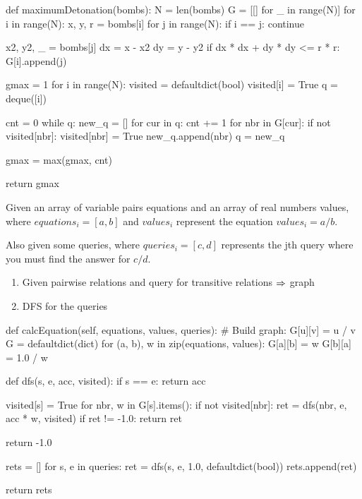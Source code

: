 \begin{python}
def maximumDetonation(bombs):
    N = len(bombs)
    G = [[] for _ in range(N)]
    for i in range(N):
        x, y, r = bombs[i]
        for j in range(N):
            if i == j:
                continue
                
            x2, y2, _ = bombs[j]
            dx = x - x2
            dy = y - y2
            if dx * dx + dy * dy <= r * r:
                G[i].append(j)

    gmax = 1
    for i in range(N):
        visited = defaultdict(bool)
        visited[i] = True
        q = deque([i])

        cnt = 0
        while q:
            new_q = []
            for cur in q:
                cnt += 1
                for nbr in G[cur]:
                    if not visited[nbr]:
                        visited[nbr] = True
                        new_q.append(nbr)
            q = new_q

        gmax = max(gmax, cnt)

    return gmax
\end{python}
 Given an array of variable pairs equations and an array of real numbers values, where $equations_i = [a, b]$ and $values_i$ represent the equation $values_i = a / b$. 

Also given some queries, where $queries_i = [c, d]$ represents the jth query where you must find the answer for $c/d$.
\begin{enumerate}
\item Given pairwise relations and query for transitive relations $\Rightarrow$ graph 
\item DFS for the queries
\end{enumerate}
\begin{python}
def calcEquation(self, equations, values, queries):
  # Build graph: G[u][v] = u / v
  G = defaultdict(dict)
  for (a, b), w in zip(equations, values):
    G[a][b] = w
    G[b][a] = 1.0 / w

  def dfs(s, e, acc, visited):
    if s == e:
      return acc
    
    visited[s] = True
    for nbr, w in G[s].items():
      if not visited[nbr]:
        ret = dfs(nbr, e, acc * w, visited)
        if ret != -1.0:
          return ret
          
    return -1.0
  
  rets = []
  for s, e in queries:
    ret = dfs(s, e, 1.0, defaultdict(bool))
    rets.append(ret)

  return rets
\end{python}
